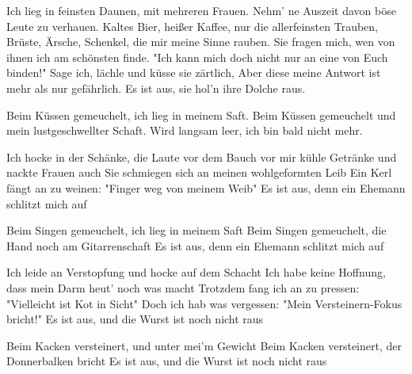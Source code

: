 \begin{guitar}
	 
	
	Ich lieg in feinsten Daunen, mit mehreren Frauen.
	Nehm’ ne Auszeit davon böse Leute zu verhauen.
	Kaltes Bier, heißer Kaffee, nur die allerfeinsten Trauben,
	Brüste, Ärsche, Schenkel, die mir meine Sinne rauben.
	Sie fragen mich, wen von ihnen ich am schönsten finde.
	"Ich kann mich doch nicht nur an eine von Euch binden!"
	Sage ich, lächle und küsse sie zärtlich,
	Aber diese meine Antwort ist mehr als nur gefährlich.
	Es ist aus, sie hol’n ihre Dolche raus.
	
	Beim Küssen gemeuchelt, ich lieg in meinem Saft.
	Beim Küssen gemeuchelt und mein lustgeschwellter Schaft.
	Wird langsam leer, ich bin bald nicht mehr.
	
	 
	
	 
	
	Ich hocke in der Schänke, die Laute vor dem Bauch
	vor mir kühle Getränke und nackte Frauen auch
	Sie schmiegen sich an meinen wohlgeformten Leib
	Ein Kerl fängt an zu weinen: "Finger weg von meinem Weib"
	Es ist aus, denn ein Ehemann schlitzt mich auf
	
	Beim Singen gemeuchelt, ich lieg in meinem Saft
	Beim Singen gemeuchelt, die Hand noch am Gitarrenschaft
	Es ist aus, denn ein Ehemann schlitzt mich auf
	
	Ich leide an Verstopfung und hocke auf dem Schacht
	Ich habe keine Hoffnung, dass mein Darm heut’ noch was macht
	Trotzdem fang ich an zu pressen: "Vielleicht ist Kot in Sicht"
	Doch ich hab was vergessen: "Mein Versteinern-Fokus bricht!"
	Es ist aus, und die Wurst ist noch nicht raus
	
	Beim Kacken versteinert, und unter mei’m Gewicht
	Beim Kacken versteinert, der Donnerbalken bricht
	Es ist aus, und die Wurst ist noch nicht raus
	
	 
	
	 
		
\end{guitar}
